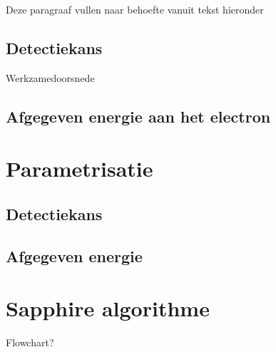 \documentclass[a4paper,11pt]{article}
\begin{document}
Deze paragraaf vullen naar behoefte vanuit tekst hieronder
\subsection{Detectiekans}
Werkzamedoorsnede
\subsection{Afgegeven energie aan het electron}

\section{Parametrisatie}
\subsection{Detectiekans}
\subsection{Afgegeven energie}

\section{Sapphire algorithme}
Flowchart?


{}

\end{document}

